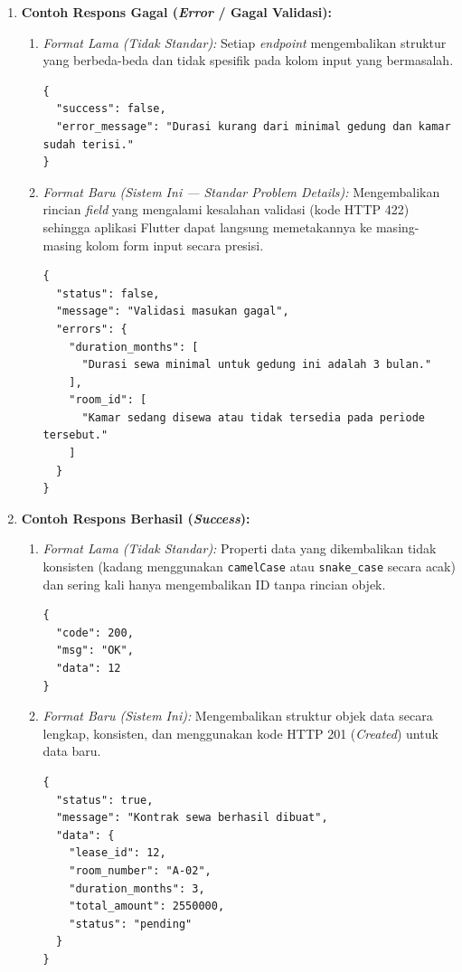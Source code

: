 \begin{enumerate}[label=\arabic*., leftmargin=*]
  \item \textbf{Contoh Respons Gagal (\textit{Error} / Gagal Validasi):}
    \begin{enumerate}[label=\alph*., leftmargin=*]
      \item \textit{Format Lama (Tidak Standar):} Setiap \textit{endpoint} mengembalikan struktur yang berbeda-beda dan tidak spesifik pada kolom input yang bermasalah.
\begin{lstlisting}
{
  "success": false,
  "error_message": "Durasi kurang dari minimal gedung dan kamar sudah terisi."
}
\end{lstlisting}
      \item \textit{Format Baru (Sistem Ini --- Standar Problem Details):} Mengembalikan rincian \textit{field} yang mengalami kesalahan validasi (kode HTTP 422) sehingga aplikasi Flutter dapat langsung memetakannya ke masing-masing kolom form input secara presisi.
\begin{lstlisting}
{
  "status": false,
  "message": "Validasi masukan gagal",
  "errors": {
    "duration_months": [
      "Durasi sewa minimal untuk gedung ini adalah 3 bulan."
    ],
    "room_id": [
      "Kamar sedang disewa atau tidak tersedia pada periode tersebut."
    ]
  }
}
\end{lstlisting}
    \end{enumerate}
  \item \textbf{Contoh Respons Berhasil (\textit{Success}):}
    \begin{enumerate}[label=\alph*., leftmargin=*]
      \item \textit{Format Lama (Tidak Standar):} Properti data yang dikembalikan tidak konsisten (kadang menggunakan \texttt{camelCase} atau \texttt{snake\_case} secara acak) dan sering kali hanya mengembalikan ID tanpa rincian objek.
\begin{lstlisting}
{
  "code": 200,
  "msg": "OK",
  "data": 12
}
\end{lstlisting}
      \item \textit{Format Baru (Sistem Ini):} Mengembalikan struktur objek data secara lengkap, konsisten, dan menggunakan kode HTTP 201 (\textit{Created}) untuk data baru.
\begin{lstlisting}
{
  "status": true,
  "message": "Kontrak sewa berhasil dibuat",
  "data": {
    "lease_id": 12,
    "room_number": "A-02",
    "duration_months": 3,
    "total_amount": 2550000,
    "status": "pending"
  }
}
\end{lstlisting}
    \end{enumerate}
\end{enumerate}

